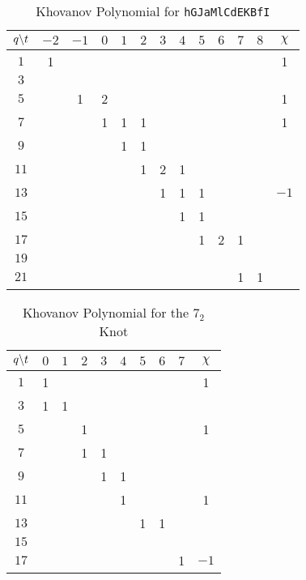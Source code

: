 \begin{table}
    \centering
    \begin{tabular}{| c | c | c | c | c | c | c | c | c | c | c | c | c |}
        \hline
        $q\symbol{92}t$&$-2$&$-1$&$0$&$1$&$2$&$3$&$4$&$5$&$6$&$7$&$8$&$\chi$\\
        \hline
        $1$&1&&&&&&&&&&&1\\
        \hline
        $3$&&&&&&&&&&&&\\
        \hline
        $5$&&1&2&&&&&&&&&1\\
        \hline
        $7$&&&1&1&1&&&&&&&1\\
        \hline
        $9$&&&&1&1&&&&&&&\\
        \hline
        $11$&&&&&1&2&1&&&&&\\
        \hline
        $13$&&&&&&1&1&1&&&&$-1$\\
        \hline
        $15$&&&&&&&1&1&&&&\\
        \hline
        $17$&&&&&&&&1&2&1&&\\
        \hline
        $19$&&&&&&&&&&&&\\
        \hline
        $21$&&&&&&&&&&1&1&\\
        \hline
    \end{tabular}
    \caption{Khovanov Polynomial for \texttt{hGJaMlCdEKBfI}}
    \label{table:hGJaMlCdEKBfI_kho}
\end{table}
\begin{table}
    \centering
    \begin{tabular}{| c | c | c | c | c | c | c | c | c | c |}
        \hline
        $q\symbol{92}t$&$0$&$1$&$2$&$3$&$4$&$5$&$6$&$7$&$\chi$\\
        \hline
        $1$&1&&&&&&&&1\\
        \hline
        $3$&1&1&&&&&&&\\
        \hline
        $5$&&&1&&&&&&1\\
        \hline
        $7$&&&1&1&&&&&\\
        \hline
        $9$&&&&1&1&&&&\\
        \hline
        $11$&&&&&1&&&&1\\
        \hline
        $13$&&&&&&1&1&&\\
        \hline
        $15$&&&&&&&&&\\
        \hline
        $17$&&&&&&&&1&$-1$\\
        \hline
    \end{tabular}
    \caption{Khovanov Polynomial for the $7_{2}$ Knot}
    \label{table:m_5_kho}
\end{table}
